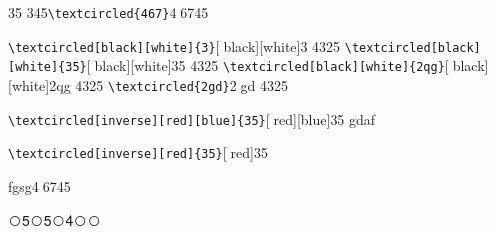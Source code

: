 \documentclass{article}
\begin{document}
35 345\verb|\textcircled{467}|\textcircled{467}45

 \verb|\textcircled[black][white]{3}|\textcircled[black][white]{3} 4325
   \verb|\textcircled[black][white]{35}|\textcircled[black][white]{35} 4325
  \verb|\textcircled[black][white]{2qg}|\textcircled[black][white]{2qg} 4325
    \verb|\textcircled{2gd}|\textcircled{2gd} 4325
 
  \verb|\textcircled[inverse][red][blue]{35}|\textcircled[red][blue]{35} gdaf
  
   \verb|\textcircled[inverse][red]{35}|\textcircled[red]{35}

fgsg\textcircled{467}45
   
\newcommand{\wcnt}{\textcircled{\themycnt}}

\wcnt5\wcnt5\wcnt4\wcnt\wcnt
\end{document}
